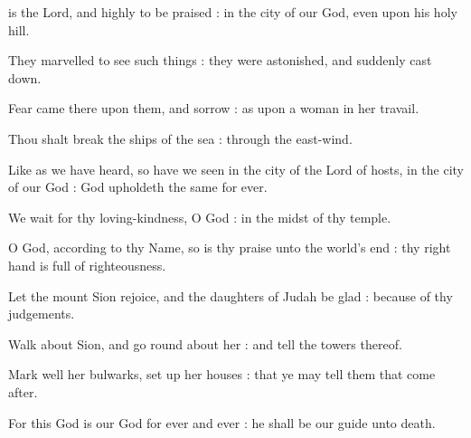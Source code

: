 
 is the Lord, and highly to be praised : in the city of our God, even upon his holy hill.\par
{}
They marvelled to see such things : they were astonished, and suddenly cast down.\par
{}Fear came there upon them, and sorrow : as upon a woman in her travail.\par
{}Thou shalt break the ships of the sea : through the east-wind.\par
{}Like as we have heard, so have we seen in the city of the Lord of hosts, in the city of our God : God upholdeth the same for ever.\par
{}We wait for thy loving-kindness, O God : in the midst of thy temple.\par
{}O God, according to thy Name, so is thy praise unto the world's end : thy right hand is full of righteousness.\par
{}Let the mount Sion rejoice, and the daughters of Judah be glad : because of thy judgements.\par
{}Walk about Sion, and go round about her : and tell the towers thereof.\par
{}Mark well her bulwarks, set up her houses : that ye may tell them that come after.\par
{}For this God is our God for ever and ever : he shall be our guide unto death.\par


